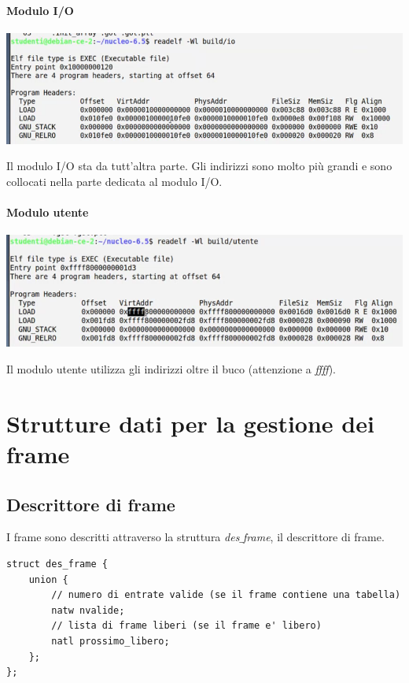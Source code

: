 \documentclass[11pt]{report}
\theoremstyle{definition}
\begin{document}
\paragraph{Modulo I/O} 
\begin{center}
	\includegraphics[scale=.70]{img/251.PNG}
\end{center}
Il modulo I/O sta da tutt'altra parte. Gli indirizzi sono molto più grandi e sono collocati nella parte dedicata al modulo I/O. 

\clearpage 
\paragraph{Modulo utente} 
\begin{center}
	\includegraphics[scale=.75]{img/250.PNG}
\end{center}
Il modulo utente utilizza gli indirizzi oltre il buco (attenzione a \emph{ffff}).

\section{Strutture dati per la gestione dei frame}
\subsection{Descrittore di frame}
I frame sono descritti attraverso la struttura \emph{des$\_$frame}, il descrittore di frame.
\small 
\begin{verbatim}
struct des_frame {
    union {
        // numero di entrate valide (se il frame contiene una tabella)
        natw nvalide;
        // lista di frame liberi (se il frame e' libero)
        natl prossimo_libero;
    };
};
\end{verbatim}
\normalsize 
\end{document}
